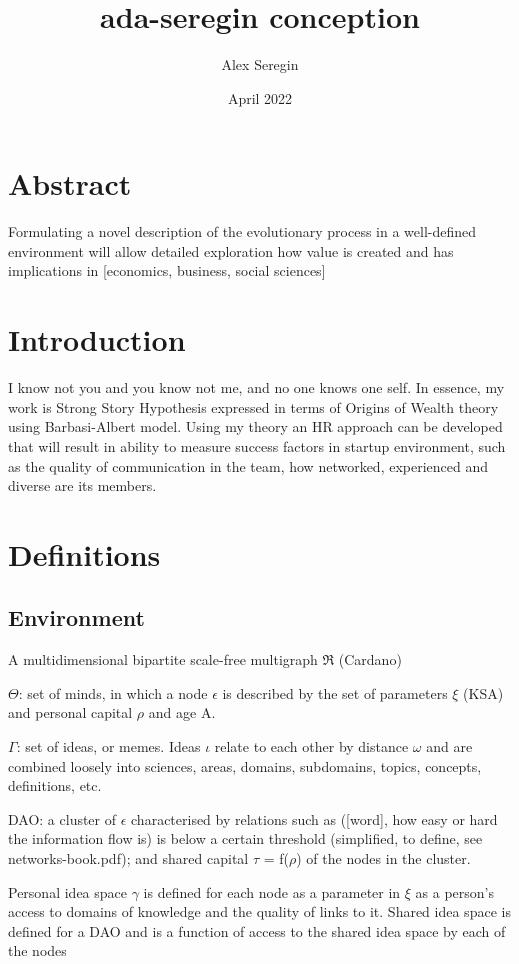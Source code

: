 \documentclass{article}
\title{ada-seregin conception}
\author{Alex Seregin}
\date{April 2022}
\begin{document}
\maketitle
\section{Abstract}
Formulating a novel description of the evolutionary process in a well-defined environment will allow detailed exploration how value is created and has implications in [economics, business, social sciences]
\section{Introduction}
I know not you and you know not me, and no one knows one self.
In essence, my work is Strong Story Hypothesis expressed in terms of Origins of Wealth theory using Barbasi-Albert model.
Using my theory an HR approach can be developed that will result in ability to measure success factors in startup environment, such as the quality of communication in the team, how networked, experienced and diverse are its members. 
\section{Definitions}
\subsection{Environment}
A multidimensional bipartite scale-free multigraph $\Re$ (Cardano)

$\Theta$: set of minds, in which a node $\epsilon$ is described by the set of parameters $\xi$ (KSA) and personal capital $\rho$ and age A.

$\Gamma$: set of ideas, or memes. Ideas $\iota$ relate to each other by distance $\omega$ and are combined loosely into sciences, areas, domains, subdomains, topics, concepts, definitions, etc.

DAO: a cluster of $\epsilon$ characterised by relations such as ([word], how easy or hard the information flow is) is below a certain threshold (simplified, to define, see networks-book.pdf); and shared capital $\tau$ = f($\rho$) of the nodes in the cluster.

Personal idea space $\gamma$ is defined for each node as a parameter in $\xi$ as a person's access to domains of knowledge and the quality of links to it. 
Shared idea space is defined for a DAO and is a function of access to the shared idea space by each of the nodes
\end{document}
